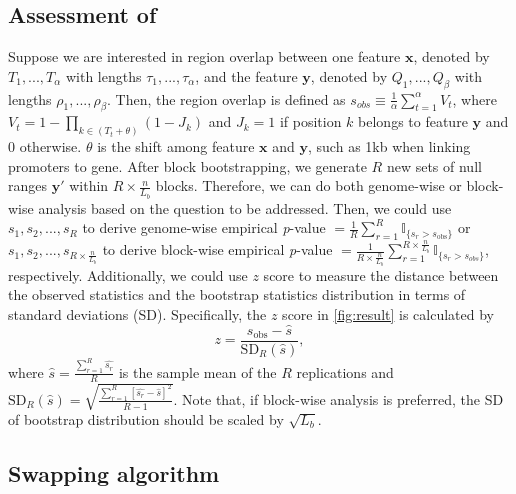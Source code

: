\documentclass{article}
\begin{document}
\subsection{Assessment of \bootranges}
Suppose we are interested in region overlap between one feature $\bm{x}$, denoted by $T_1, ..., T_\alpha$ with lengths $\tau_1,..., \tau_\alpha$, and the feature $\bm{y}$, denoted by $Q_1, ..., Q_\beta$ with lengths $\rho_1, ..., \rho_\beta$.
Then, the region overlap is defined as $s_{obs} \equiv  \frac{1}{\alpha}\sum_{t=1}^\alpha V_t$, where $V_t=1-\prod_{k\in (T_t+\theta)}(1-J_k)$ and $J_k=1$ if position $k$ belongs to feature $\bm{y}$ and 0 otherwise. 
$\theta$ is the shift among feature $\bm{x}$ and $\bm{y}$, such as 1kb when linking promoters to gene. 
After block bootstrapping, we generate $R$ new sets of null ranges $\bm{y'}$ within $R\times \frac{n}{L_b}$ blocks. 
Therefore, we can do both genome-wise or block-wise analysis based on the question to be addressed.
Then, we could use $s_{1}, s_{2}, ..., s_{R}$ to derive genome-wise empirical \textit{p}-value $=  \frac{1}{R} \sum_{r=1}^R \mathbb{I}_{\{s_r > s_\text{obs}\}}$ or $s_{1}, s_{2}, ..., s_{R\times \frac{n}{L_b}}$ to derive block-wise empirical \textit{p}-value $=  \frac{1}{R\times \frac{n}{L_b}} \sum_{r=1}^{R\times \frac{n}{L_b}} \mathbb{I}_{\{s_r > s_{obs}\}}$, respectively.
Additionally, we could use $z$ score to measure the distance between the observed statistics and the bootstrap statistics distribution in terms of standard deviations (SD). 
Specifically, the $z$ score in \cref{fig:result} is calculated by $$z = \frac{s_\text{obs} - \widehat{s}}{ \text{SD}_R(\widehat{s})},$$ where $\widehat{s} = \frac{\sum_{r=1}^R \widehat{s_r}}{R}$ is the sample mean of the $R$ replications and $\text{SD}_R(\widehat{s}) = \sqrt{\frac{\sum_{r=1}^R [\widehat{s_r}-\widehat{s}]^2}{R-1}}$.
Note that, if block-wise analysis is preferred, the SD of bootstrap distribution should be scaled by $\sqrt{L_b}$.





\subsection{Swapping algorithm}\label{sec:algorithm}
\end{document}

